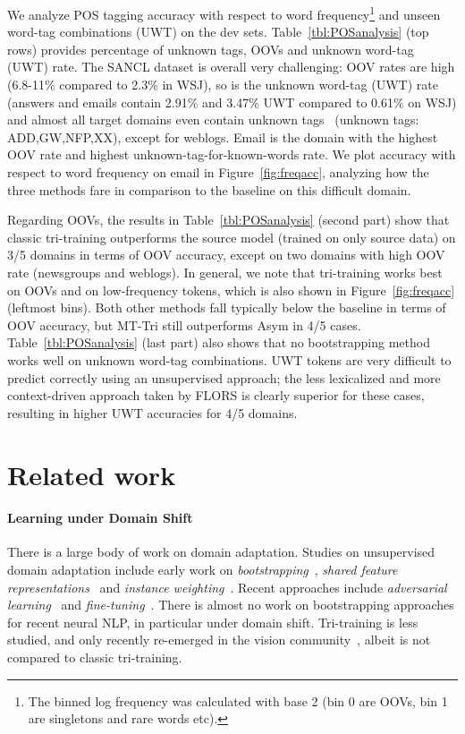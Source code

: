 \documentclass[11pt,a4paper]{article}
\begin{document}
We analyze POS tagging accuracy with respect to word frequency\footnote{The binned log frequency was calculated with base 2 (bin 0 are OOVs, bin 1 are singletons and rare words etc).} and unseen word-tag combinations (UWT) on the dev sets. Table~\ref{tbl:POSanalysis} (top rows) provides percentage of unknown tags, OOVs and unknown word-tag (UWT) rate.  The SANCL dataset is overall very challenging: OOV rates are high (6.8-11\% compared to 2.3\% in WSJ), so is the unknown word-tag (UWT) rate (answers and emails contain 2.91\% and 3.47\% UWT compared to 0.61\% on WSJ) and almost all target domains even contain unknown tags~\cite{Schnabel2014} (unknown tags: ADD,GW,NFP,XX), except for weblogs. Email is the domain with the highest OOV rate and highest unknown-tag-for-known-words rate. We  plot accuracy with respect to word frequency on email in Figure~\ref{fig:freqacc}, analyzing how the three methods fare in comparison to the baseline on this difficult domain. 

Regarding OOVs, the results in Table~\ref{tbl:POSanalysis} (second part) show that classic tri-training outperforms the source model (trained on only source data) on 3/5 domains in terms of OOV accuracy, except on two domains with high OOV rate (newsgroups and weblogs).
In general, we note that tri-training works best on OOVs and on low-frequency tokens, which is also shown in  Figure~\ref{fig:freqacc} (leftmost bins). Both other methods fall typically below the baseline in terms of OOV accuracy, but MT-Tri still outperforms Asym in 4/5 cases. Table~\ref{tbl:POSanalysis} (last part) also shows that no bootstrapping method works well on unknown word-tag combinations. UWT tokens are very difficult to predict correctly using an unsupervised approach; the less lexicalized and more context-driven approach taken by FLORS is clearly superior for these cases, resulting in higher UWT accuracies for 4/5 domains.  





\section{Related work}

\paragraph{Learning under Domain Shift} There is a large body of work on domain adaptation. Studies on unsupervised domain adaptation include early work on \textit{bootstrapping}~\cite{Steedman2003,McClosky2006a}, \textit{shared feature representations}~\cite{Blitzer2006,Blitzer2007} and \textit{instance weighting}~\cite{Jiang2007}. Recent approaches include \textit{adversarial learning}~\cite{Ganin2016} and \textit{fine-tuning}~\cite{sennrich-haddow-birch:2016:P16-11}. There is almost no work on bootstrapping approaches for recent neural NLP, in particular under domain shift. Tri-training is less studied, and only recently re-emerged in the vision community~\cite{Saito2017}, albeit is not compared to classic tri-training.
\end{document}
